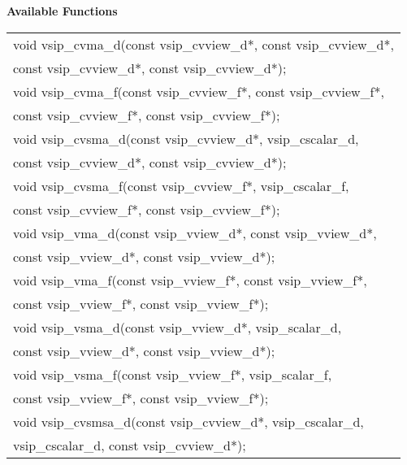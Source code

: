 \\\cvsiplh
\\ \hspace*{.8cm} \vspace*{.1cm} \textbf{Available Functions }
\\ \hspace*{1.1cm} {
\ttfamily
\begin{tabular}[H]{l}
void vsip\_cvma\_d(const vsip\_cvview\_d*, const vsip\_cvview\_d*,\\*\hspace{.7cm}const vsip\_cvview\_d*, const vsip\_cvview\_d*);\\
void vsip\_cvma\_f(const vsip\_cvview\_f*, const vsip\_cvview\_f*,\\*\hspace{.7cm}const vsip\_cvview\_f*, const vsip\_cvview\_f*);\\
void vsip\_cvsma\_d(const vsip\_cvview\_d*, vsip\_cscalar\_d,\\*\hspace{.7cm}const vsip\_cvview\_d*, const vsip\_cvview\_d*);\\
void vsip\_cvsma\_f(const vsip\_cvview\_f*, vsip\_cscalar\_f,\\*\hspace{.7cm}const vsip\_cvview\_f*, const vsip\_cvview\_f*);\\
void vsip\_vma\_d(const vsip\_vview\_d*, const vsip\_vview\_d*,\\*\hspace{.7cm}const vsip\_vview\_d*, const vsip\_vview\_d*);\\
void vsip\_vma\_f(const vsip\_vview\_f*, const vsip\_vview\_f*,\\*\hspace{.7cm}const vsip\_vview\_f*, const vsip\_vview\_f*);\\
void vsip\_vsma\_d(const vsip\_vview\_d*, vsip\_scalar\_d,\\*\hspace{.7cm}const vsip\_vview\_d*, const vsip\_vview\_d*);\\
void vsip\_vsma\_f(const vsip\_vview\_f*, vsip\_scalar\_f,\\*\hspace{.7cm}const vsip\_vview\_f*, const vsip\_vview\_f*);\\
void vsip\_cvsmsa\_d(const vsip\_cvview\_d*, vsip\_cscalar\_d,\\*\hspace{.7cm}vsip\_cscalar\_d, const vsip\_cvview\_d*);\\

\end{tabular}}
